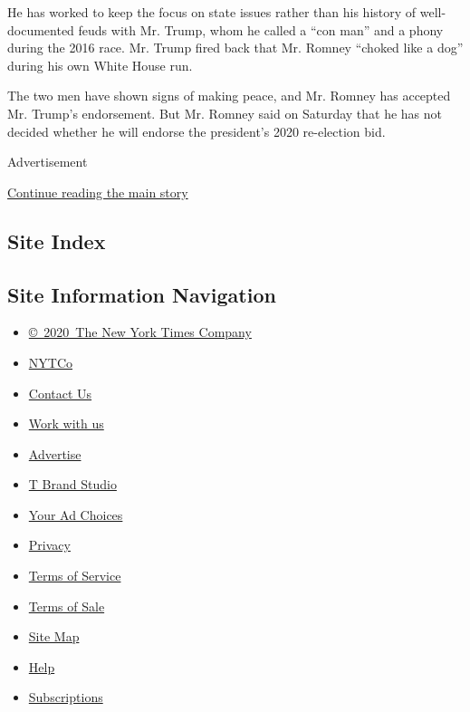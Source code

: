 He has worked to keep the focus on state issues rather than his history
of well-documented feuds with Mr. Trump, whom he called a ``con man''
and a phony during the 2016 race. Mr. Trump fired back that Mr. Romney
``choked like a dog'' during his own White House run.

The two men have shown signs of making peace, and Mr. Romney has
accepted Mr. Trump's endorsement. But Mr. Romney said on Saturday that
he has not decided whether he will endorse the president's 2020
re-election bid.

Advertisement

\protect\hyperlink{after-bottom}{Continue reading the main story}

\hypertarget{site-index}{%
\subsection{Site Index}\label{site-index}}

\hypertarget{site-information-navigation}{%
\subsection{Site Information
Navigation}\label{site-information-navigation}}

\begin{itemize}
\tightlist
\item
  \href{https://help.nytimes3xbfgragh.onion/hc/en-us/articles/115014792127-Copyright-notice}{©~2020~The
  New York Times Company}
\end{itemize}

\begin{itemize}
\tightlist
\item
  \href{https://www.nytco.com/}{NYTCo}
\item
  \href{https://help.nytimes3xbfgragh.onion/hc/en-us/articles/115015385887-Contact-Us}{Contact
  Us}
\item
  \href{https://www.nytco.com/careers/}{Work with us}
\item
  \href{https://nytmediakit.com/}{Advertise}
\item
  \href{http://www.tbrandstudio.com/}{T Brand Studio}
\item
  \href{https://www.nytimes3xbfgragh.onion/privacy/cookie-policy\#how-do-i-manage-trackers}{Your
  Ad Choices}
\item
  \href{https://www.nytimes3xbfgragh.onion/privacy}{Privacy}
\item
  \href{https://help.nytimes3xbfgragh.onion/hc/en-us/articles/115014893428-Terms-of-service}{Terms
  of Service}
\item
  \href{https://help.nytimes3xbfgragh.onion/hc/en-us/articles/115014893968-Terms-of-sale}{Terms
  of Sale}
\item
  \href{https://spiderbites.nytimes3xbfgragh.onion}{Site Map}
\item
  \href{https://help.nytimes3xbfgragh.onion/hc/en-us}{Help}
\item
  \href{https://www.nytimes3xbfgragh.onion/subscription?campaignId=37WXW}{Subscriptions}
\end{itemize}
